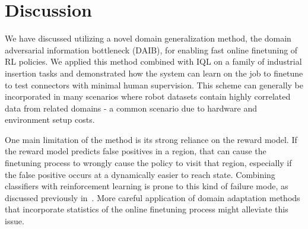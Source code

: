 


\section{Discussion}

We have discussed utilizing a novel domain generalization method, the domain adversarial information bottleneck (DAIB), for enabling fast online finetuning of RL policies.
We applied this method combined with IQL on a family of industrial insertion tasks and demonstrated how the system can learn on the job to finetune to test connectors with minimal human supervision.
This scheme can generally be incorporated in many scenarios where robot datasets contain highly correlated data from related domains - a common scenario due to hardware and environment setup costs.

One main limitation of the method is its strong reliance on the reward model. If the reward model predicts false positives in a region, that can cause the finetuning process to wrongly cause the policy to visit that region, especially if the false positive occurs at a dynamically easier to reach state. Combining classifiers with reinforcement learning is prone to this kind of failure mode, as discussed previously in~\cite{fu2018vice}. More careful application of domain adaptation methods that incorporate statistics of the online finetuning process might alleviate this issue.


% 
% 

% 
